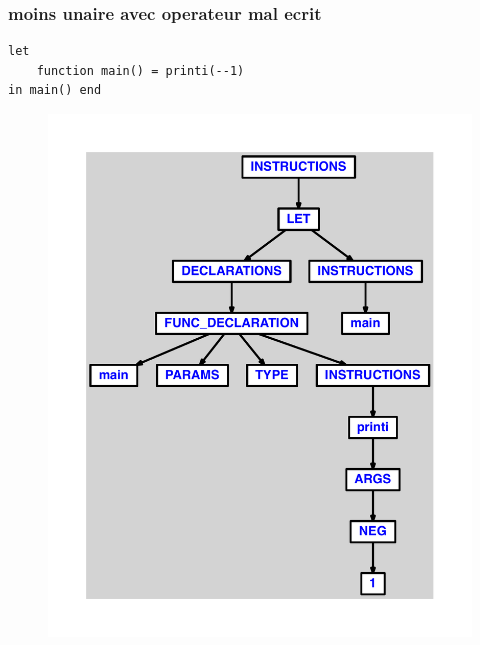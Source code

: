 \documentclass{article}
\begin{document}
\subsubsection{moins unaire avec operateur mal ecrit}
\begin{lstlisting}
let
	function main() = printi(--1)
in main() end
\end{lstlisting}
\newpage
\begin{figure}[H]
\centering
\includegraphics[max width=\textwidth]{ast/ast_26.pdf}
\end{figure}
\newpage
\end{document}
